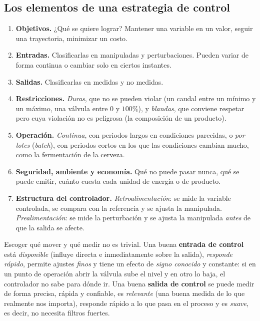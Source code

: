\subsection{Los elementos de una estrategia de control}

\begin{receta}
\begin{enumerate}
  \item \textbf{Objetivos.} ¿Qué se quiere lograr? Mantener una variable en un valor, seguir una trayectoria, minimizar un costo.
  \item \textbf{Entradas.} Clasificarlas en manipuladas y perturbaciones. Pueden variar de forma continua o cambiar solo en ciertos instantes.
  \item \textbf{Salidas.} Clasificarlas en medidas y no medidas.
  \item \textbf{Restricciones.} \emph{Duras}, que no se pueden violar (un caudal entre un mínimo y un máximo, una válvula entre $0$ y $100\%$), y \emph{blandas}, que conviene respetar pero cuya violación no es peligrosa (la composición de un producto).
  \item \textbf{Operación.} \emph{Continua}, con periodos largos en condiciones parecidas, o \emph{por lotes} (\emph{batch}), con periodos cortos en los que las condiciones cambian mucho, como la fermentación de la cerveza.
  \item \textbf{Seguridad, ambiente y economía.} Qué no puede pasar nunca, qué se puede emitir, cuánto cuesta cada unidad de energía o de producto.
  \item \textbf{Estructura del controlador.} \emph{Retroalimentación}: se mide la variable controlada, se compara con la referencia y se ajusta la manipulada. \emph{Prealimentación}: se mide la perturbación y se ajusta la manipulada \emph{antes} de que la salida se afecte.
\end{enumerate}
\end{receta}

Escoger qué mover y qué medir no es trivial. Una buena \textbf{entrada de control} está \emph{disponible} (influye directa e inmediatamente sobre la salida), \emph{responde rápido}, permite ajustes \emph{finos} y tiene un efecto de \emph{signo conocido} y constante: si en un punto de operación abrir la válvula sube el nivel y en otro lo baja, el controlador no sabe para dónde ir. Una buena \textbf{salida de control} se puede medir de forma precisa, rápida y confiable, es \emph{relevante} (una buena medida de lo que realmente nos importa), responde rápido a lo que pasa en el proceso y es \emph{suave}, es decir, no necesita filtros fuertes.

